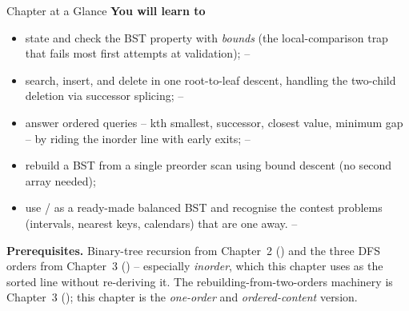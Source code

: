 \begin{chaptertheorybox}{Chapter at a Glance}
\textbf{You will learn to}
\begin{itemize}[nosep]
  \item state and check the BST property with \emph{bounds} (the local-comparison trap that fails
        most first attempts at validation); \hfill{}--
  \item search, insert, and delete in one root-to-leaf descent, handling the two-child deletion
        via successor splicing; \hfill{}--
  \item answer ordered queries -- kth smallest, successor, closest value, minimum gap -- by riding
        the inorder line with early exits; \hfill{}--
  \item rebuild a BST from a single preorder scan using bound descent (no second array needed);
        \hfill{}
  \item use / as a ready-made balanced BST and recognise the contest
        problems (intervals, nearest keys, calendars) that are one  away.
        \hfill{}--
\end{itemize}

\textbf{Prerequisites.} Binary-tree recursion from Chapter~2 () and the three DFS
orders from Chapter~3 () -- especially \emph{inorder}, which this chapter uses as the
sorted line without re-deriving it. The rebuilding-from-two-orders machinery is Chapter~3
(); this chapter is the \emph{one-order} and \emph{ordered-content} version.
\end{chaptertheorybox}

